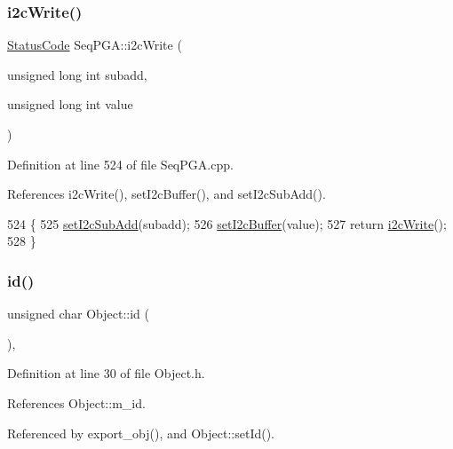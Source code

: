 \subsubsection{\texorpdfstring{i2c\+Write()}{i2cWrite()}\hspace{0.1cm}{\footnotesize\ttfamily [2/2]}}
{\footnotesize\ttfamily \hyperlink{classStatusCode}{Status\+Code} Seq\+P\+G\+A\+::i2c\+Write (\begin{DoxyParamCaption}\item[{unsigned long int}]{subadd,  }\item[{unsigned long int}]{value }\end{DoxyParamCaption})}



Definition at line 524 of file Seq\+P\+G\+A.\+cpp.



References i2c\+Write(), set\+I2c\+Buffer(), and set\+I2c\+Sub\+Add().


\begin{DoxyCode}
524                                                                             \{
525   \hyperlink{classSeqPGA_a348c5d982223fb5cf2878e5bf3c6429c}{setI2cSubAdd}(subadd);
526   \hyperlink{classSeqPGA_ab93beca49a31c1f9fddc915e9efeeaa0}{setI2cBuffer}(value);
527   \textcolor{keywordflow}{return} \hyperlink{classSeqPGA_a429076ca3a4ece94182bd95c623bb9d0}{i2cWrite}();
528 \}
\end{DoxyCode}
\mbox{\label{classObject_af99145335cc61ff6e2798ea17db009d2}} 
\subsubsection{\texorpdfstring{id()}{id()}}
{\footnotesize\ttfamily unsigned char Object\+::id (\begin{DoxyParamCaption}{ }\end{DoxyParamCaption})\hspace{0.3cm}{\ttfamily [inline]}, {\ttfamily [inherited]}}



Definition at line 30 of file Object.\+h.



References Object\+::m\+\_\+id.



Referenced by export\+\_\+obj(), and Object\+::set\+Id().


